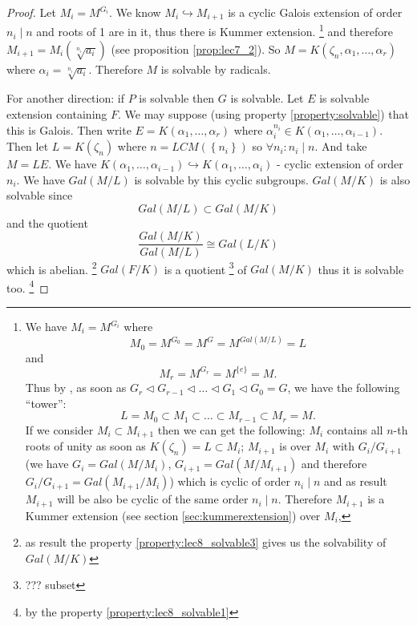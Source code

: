 \begin{theorem}
\begin{proof}
    Let $M_i = M^{G_i}$. We know $M_i \hookrightarrow M_{i+1}$ is a
    cyclic Galois extension of order $n_i \mid n$ and roots of 1 are
    in it, thus there is Kummer extension.
    \footnote{
      We have $M_i = M^{G_i}$ where
      \[
      M_0 = M^{G_0} = M^G = M^{Gal\left(M/L\right)} = L
      \]
      and
      \[
      M_r = M^{G_r} = M^{\{e\}} = M.
      \]
      Thus by ,
      as soon as
      $G_r \triangleleft G_{r-1} \triangleleft \dots \triangleleft G_1
      \triangleleft G_0 = G$,
      we have the
      following ``tower'':
      \[
      L = M_0 \subset M_1 \subset \dots \subset M_{r-1} \subset M_r = M.
      \]
      If we consider $M_i \subset M_{i+1}$ then we can get the
      following: $M_i$ contains all $n$-th roots of unity as soon as
      $K\left(\zeta_n\right) = L \subset M_i$; $M_{i+1}$ is
       over $M_i$ with
       $G_i/G_{i+1}$
      (we have $G_i = Gal\left(M/M_i\right)$,
      $G_{i+1} = Gal\left(M/M_{i+1}\right)$ and therefore
      $G_i/G_{i+1} = Gal\left(M_{i+1}/M_i\right)$)
      which is cyclic of order
      $n_i \mid n$ and as
      result $M_{i+1}$ will be also be cyclic of the same order $n_i
      \mid n$. Therefore $M_{i+1}$ is a Kummer extension 
      (see section \ref{sec:kummerextension}) over $M_i$,
    }
    and therefore
    $M_{i+1} = M_i\left(\sqrt[n_i]{a_i}\right)$ (see proposition
    \ref{prop:lec7_2}).
    So $M = K\left(\zeta_n, \alpha_1, \dots, \alpha_r\right)$ where
    $\alpha_i = \sqrt[n_i]{a_i}$. Therefore $M$ is solvable by
    radicals.

    For another direction: if $P$ is solvable then $G$ is
    solvable. Let $E$ is solvable extension containing $F$. We may
    suppose (using property \ref{property:solvable}) that this is Galois.
    Then write
    $E = K\left(\alpha_1, \dots, \alpha_r\right)$ where
    $\alpha_i^{n_i} \in K\left(\alpha_1, \dots,
    \alpha_{i-1}\right)$. Then let $L = K\left(\zeta_n\right)$
    where $n = LCM\left(\left\{n_i\right\}\right)$ so
    $\forall n_i: n_i \mid n$. And
    take $M = LE$. We have
    $K\left(\alpha_1, \dots, \alpha_{i-1}\right) \hookrightarrow
    K\left(\alpha_1, \dots, \alpha_i\right)$ - cyclic extension of
    order $n_i$. We have $Gal\left(M/L\right)$ is solvable by this
    cyclic subgroups. $Gal\left(M/K\right)$ is also solvable since
    \[
    Gal\left(M/L\right) \subset Gal\left(M/K\right)
    \]
    and the quotient
    \[
    \frac{Gal\left(M/K\right)}{Gal\left(M/L\right)}
    \cong Gal\left(L/K\right)
    \]
    which is abelian.
    \footnote{
      as result the property \ref{property:lec8_solvable3} gives us
      the solvability of $Gal\left(M/K\right)$
    }
    $Gal\left(F/K\right)$ is a quotient
    \footnote{
      ??? subset
    }
    of $Gal\left(M/K\right)$ thus
    it is solvable too.
    \footnote{
      by the property \ref{property:lec8_solvable1}
    }    
  \end{proof}
  \label{thm:lec8_1}
\end{theorem}

